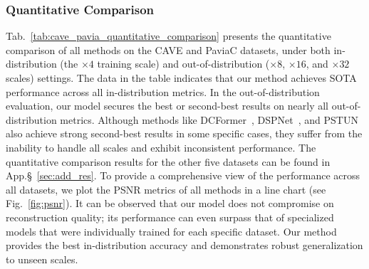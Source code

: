 \subsubsection{Quantitative Comparison}
Tab.~\ref{tab:cave_pavia_quantitative_comparison} presents the quantitative comparison of all methods on the CAVE and PaviaC datasets, under both in-distribution (the $\times4$ training scale) and out-of-distribution ($\times8$, $\times16$, and $\times32$ scales) settings. The data in the table indicates that our method achieves SOTA performance across all in-distribution metrics. In the out-of-distribution evaluation, our model secures the best or second-best results on nearly all out-of-distribution metrics. Although methods like DCFormer~\cite{wu2025fully}, DSPNet~\cite{sun2023dual}, and PSTUN~\cite{wang2025perceptive} also achieve strong second-best results in some specific cases, they suffer from the inability to handle all scales and exhibit inconsistent performance. The quantitative comparison results for the other five datasets can be found in App.\S~\ref{sec:add_res}.
To provide a comprehensive view of the performance across all datasets, we plot the PSNR metrics of all methods in a line chart (see Fig.~\ref{fig:psnr}). It can be observed that our model does not compromise on reconstruction quality; its performance can even surpass that of specialized models that were individually trained for each specific dataset. Our method provides the best in-distribution accuracy and demonstrates robust generalization to unseen scales.
